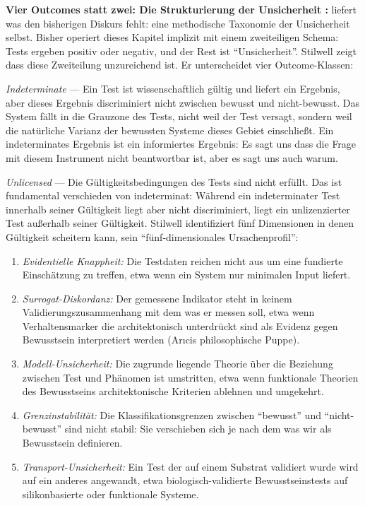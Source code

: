 \documentclass[acmlarge, noacm]{acmart}
\begin{document}
\textbf{Vier Outcomes statt zwei: Die Strukturierung der Unsicherheit \cite{stilwell2026}:} \citet{stilwell2026} liefert was den bisherigen Diskurs fehlt: eine methodische Taxonomie der Unsicherheit selbst. Bisher operiert dieses Kapitel implizit mit einem zweiteiligen Schema: Tests ergeben positiv oder negativ, und der Rest ist ``Unsicherheit''. Stilwell zeigt dass diese Zweiteilung unzureichend ist. Er unterscheidet vier Outcome-Klassen:

\textit{Indeterminate} --- Ein Test ist wissenschaftlich gültig und liefert ein Ergebnis, aber dieses Ergebnis discriminiert nicht zwischen bewusst und nicht-bewusst. Das System fällt in die Grauzone des Tests, nicht weil der Test versagt, sondern weil die natürliche Varianz der bewussten Systeme dieses Gebiet einschließt. Ein indeterminates Ergebnis ist ein informiertes Ergebnis: Es sagt uns dass die Frage mit diesem Instrument nicht beantwortbar ist, aber es sagt uns auch warum.

\textit{Unlicensed} --- Die Gültigkeitsbedingungen des Tests sind nicht erfüllt. Das ist fundamental verschieden von indeterminat: Während ein indeterminater Test innerhalb seiner Gültigkeit liegt aber nicht discriminiert, liegt ein unlizenzierter Test außerhalb seiner Gültigkeit. Stilwell identifiziert fünf Dimensionen in denen Gültigkeit scheitern kann, sein ``fünf-dimensionales Ursachenprofil'':

\begin{enumerate}
\item \textit{Evidentielle Knappheit:} Die Testdaten reichen nicht aus um eine fundierte Einschätzung zu treffen, etwa wenn ein System nur minimalen Input liefert.

\item \textit{Surrogat-Diskordanz:} Der gemessene Indikator steht in keinem Validierungszusammenhang mit dem was er messen soll, etwa wenn Verhaltensmarker die architektonisch unterdrückt sind als Evidenz gegen Bewusstsein interpretiert werden (Arıcis philosophische Puppe).

\item \textit{Modell-Unsicherheit:} Die zugrunde liegende Theorie über die Beziehung zwischen Test und Phänomen ist umstritten, etwa wenn funktionale Theorien des Bewusstseins architektonische Kriterien ablehnen und umgekehrt.

\item \textit{Grenzinstabilität:} Die Klassifikationsgrenzen zwischen ``bewusst'' und ``nicht-bewusst'' sind nicht stabil: Sie verschieben sich je nach dem was wir als Bewusstsein definieren.

\item \textit{Transport-Unsicherheit:} Ein Test der auf einem Substrat validiert wurde wird auf ein anderes angewandt, etwa biologisch-validierte Bewusstseinstests auf silikonbasierte oder funktionale Systeme.
\end{enumerate}
\end{document}
